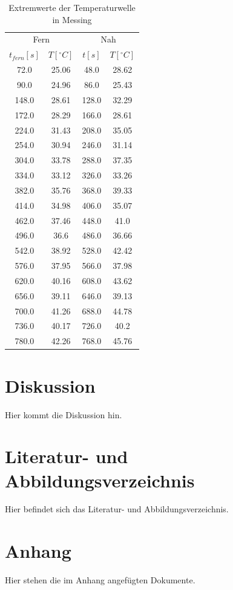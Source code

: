\documentclass[11pt]{article}
\begin{document}
\begin{table}[h]
\centering
\label{messing_extr}

\begin{tabular}{c|c||c|c}
\multicolumn{2}{c||}{Fern} & \multicolumn{2}{c}{Nah}\\
$t_{fern}[s]$ & $T[^\circ C]$ & $t[s]$ & $T[^\circ C]$ \\
\hline
72.0 & 25.06 & 48.0 & 28.62\\
90.0 & 24.96 & 86.0 & 25.43\\
148.0 & 28.61 & 128.0 & 32.29\\
172.0 & 28.29 & 166.0 & 28.61\\
224.0 & 31.43 & 208.0 & 35.05\\
254.0 & 30.94 & 246.0 & 31.14\\
304.0 & 33.78 & 288.0 & 37.35\\
334.0 & 33.12 & 326.0 & 33.26\\
382.0 & 35.76 & 368.0 & 39.33\\
414.0 & 34.98 & 406.0 & 35.07\\
462.0 & 37.46 & 448.0 & 41.0\\
496.0 & 36.6 & 486.0 & 36.66\\
542.0 & 38.92 & 528.0 & 42.42\\
576.0 & 37.95 & 566.0 & 37.98\\
620.0 & 40.16 & 608.0 & 43.62\\
656.0 & 39.11 & 646.0 & 39.13\\
700.0 & 41.26 & 688.0 & 44.78\\
736.0 & 40.17 & 726.0 & 40.2\\
780.0 & 42.26 & 768.0 & 45.76\\
\hline
\end{tabular}
\caption{Extremwerte der Temperaturwelle in Messing}
\end{table}

\section{Diskussion}
Hier kommt die Diskussion hin.
\section{Literatur- und Abbildungsverzeichnis}
Hier befindet sich das Literatur- und Abbildungsverzeichnis.
\section{Anhang}
Hier stehen die im Anhang angefügten Dokumente.
\end{document}
